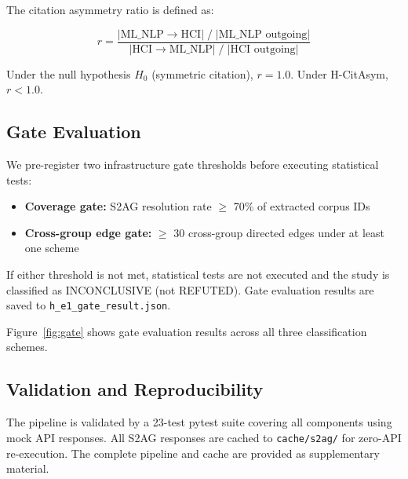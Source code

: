 The citation asymmetry ratio is defined as:

\begin{equation}
r = \frac{|\text{ML\_NLP} \to \text{HCI}| \;/\; |\text{ML\_NLP outgoing}|}{|\text{HCI} \to \text{ML\_NLP}| \;/\; |\text{HCI outgoing}|}
\end{equation}

Under the null hypothesis $H_0$ (symmetric citation), $r = 1.0$. Under H-CitAsym, $r < 1.0$.

\subsection{Gate Evaluation}

We pre-register two infrastructure gate thresholds before executing statistical tests:

\begin{itemize}
\item \textbf{Coverage gate:} S2AG resolution rate $\geq$ 70\% of extracted corpus IDs
\item \textbf{Cross-group edge gate:} $\geq$ 30 cross-group directed edges under at least one scheme
\end{itemize}

If either threshold is not met, statistical tests are not executed and the study is classified as INCONCLUSIVE (not REFUTED).
Gate evaluation results are saved to \texttt{h\_e1\_gate\_result.json}.

Figure~\ref{fig:gate} shows gate evaluation results across all three classification schemes.

\subsection{Validation and Reproducibility}

The pipeline is validated by a 23-test pytest suite covering all components using mock API responses.
All S2AG responses are cached to \texttt{cache/s2ag/} for zero-API re-execution.
The complete pipeline and cache are provided as supplementary material.

